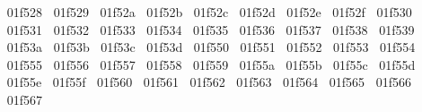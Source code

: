 {  ^^^^^^01f528%
  ^^^^^^01f529%
  ^^^^^^01f52a%
  ^^^^^^01f52b%
  ^^^^^^01f52c%
  ^^^^^^01f52d%
  ^^^^^^01f52e%
  ^^^^^^01f52f%
  ^^^^^^01f530%
  ^^^^^^01f531%
  ^^^^^^01f532%
  ^^^^^^01f533%
  ^^^^^^01f534%
  ^^^^^^01f535%
  ^^^^^^01f536%
  ^^^^^^01f537%
  ^^^^^^01f538%
  ^^^^^^01f539%
  ^^^^^^01f53a%
  ^^^^^^01f53b%
  ^^^^^^01f53c%
  ^^^^^^01f53d%
  ^^^^^^01f550%
  ^^^^^^01f551%
  ^^^^^^01f552%
  ^^^^^^01f553%
  ^^^^^^01f554%
  ^^^^^^01f555%
  ^^^^^^01f556%
  ^^^^^^01f557%
  ^^^^^^01f558%
  ^^^^^^01f559%
  ^^^^^^01f55a%
  ^^^^^^01f55b%
  ^^^^^^01f55c%
  ^^^^^^01f55d%
  ^^^^^^01f55e%
  ^^^^^^01f55f%
  ^^^^^^01f560%
  ^^^^^^01f561%
  ^^^^^^01f562%
  ^^^^^^01f563%
  ^^^^^^01f564%
  ^^^^^^01f565%
  ^^^^^^01f566%
  ^^^^^^01f567%
}
